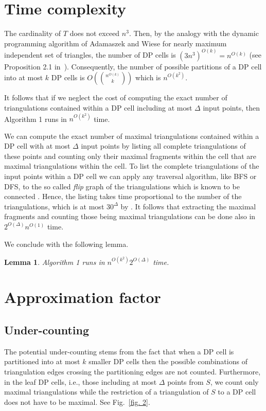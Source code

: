 \documentclass[a4paper]{article}
\newtheorem{lemma}{Lemma}
\begin{document}
\section{Time complexity}

The cardinality of $T$ does not exceed $n^3$.
Then, by the analogy with the dynamic
programming algorithm of Adamaszek and Wiese for
nearly maximum independent set
of triangles, the number
of DP cells is $(3n^3)^{O(k)}=n^{O(k)}$
(see Proposition 2.1 in~\cite{AW14}).
Consequently, the number of possible
partitions of a DP cell into at most
$k$ DP cells is $O({n^{O(k)} \choose k})$
which is  $n^{O(k^2)}$.

It follows that if we
neglect the cost of computing
the exact number of triangulations
contained within a DP cell including
at most $\Delta$ input points, then
Algorithm 1
runs in $n^{O(k^2)}$ time.


We can compute the exact
number of maximal triangulations contained
within a DP cell with at most
$\Delta$ input points   by
listing all complete triangulations
of these points and counting
only their maximal fragments
within the cell that are
maximal triangulations within the cell.
To list 
the complete triangulations
of the input points within a DP cell
we can apply any traversal
algorithm, like BFS or DFS, to
the so called {\em flip} graph
 of the triangulations which
is known to be connected \cite{S78}.
Hence, the listing takes
time proportional
to the number of
the triangulations, which
is at most $30^{\Delta}$ by \cite{SS11}.
It follows that
extracting the maximal fragments
and counting those
being maximal triangulations can be done
also in $2^{O(\Delta)}n^{O(1)}$ time.

We conclude with the following lemma.

\begin{lemma}\label{lem: time}
Algorithm 1 runs
in  $n^{O(k^2)}2^{O(\Delta)}$ time. 
\end{lemma}

\section{Approximation factor}

\subsection{Under-counting}

The potential under-counting
stems from the fact that when
a DP cell is partitioned
into at most $k$ smaller DP cells
then the possible
combinations of triangulation
edges crossing the partitioning edges
are not counted. Furthermore,
in the leaf DP cells, i.e.,
those including at most $\Delta $
points from $S$, we count only
maximal triangulations while
the restriction of a triangulation
of $S$ to a DP cell does not have
to be maximal.
See Fig.~\ref{fig. 2}.
\end{document}
